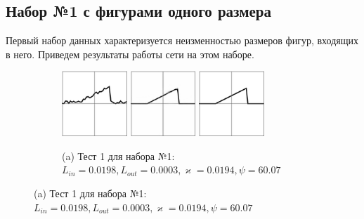\documentclass[12pt, a4paper]{article}
\renewcommand{\kappa}{\varkappa}
\begin{document}
\subsection{Набор №1 с фигурами одного размера}
\vspace{-0.5em}
Первый набор данных характеризуется неизменностью размеров фигур, входящих в него. Приведем результаты работы сети на этом наборе.
\vspace{-0.5em}
\begin{figure}[!hp]
	\centering
	\begin{subfigure}{\textwidth}
		\centering
		\includegraphics[width=0.27\textwidth]{res_n1_1}
		\hfill
		\includegraphics[width=0.27\textwidth]{res_n1_2}
		\hfill
		\includegraphics[width=0.27\textwidth]{1}
		\caption*{\small (a) Тест 1 для набора №1: $L_{in} = 0.0198, 
		L_{out} = 0.0003, 
		\kappa = 0.0194,
		 \psi = 60.07
		  $}
	\end{subfigure}
	

\end{figure}
\end{document}
